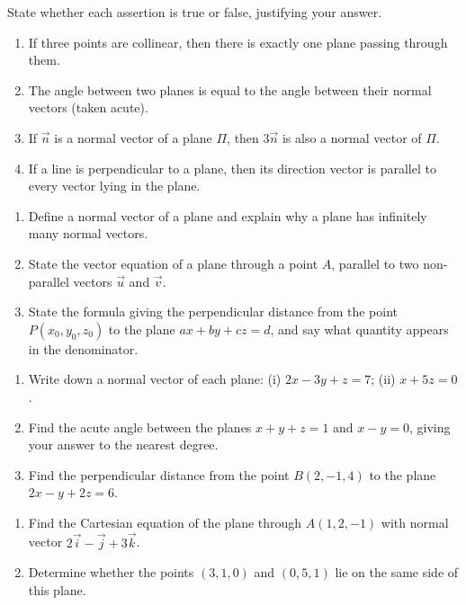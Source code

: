 \documentclass[11pt]{article}
\newcommand{\cle}[1]{{\popxbold\color{popdark}#1}}
\newcounter{popsec}
\newcounter{popsub}
\newcommand{\courssub}[1]{%
  \stepcounter{popsub}%
  \par\vspace{9pt}\noindent{\popxbold\fontsize{11.5}{13}\selectfont\color{popink}{\color{poporange}\thepopsec.\thepopsub}\hspace{6pt}#1}\par\nopagebreak\vspace{4pt}
}
\begin{document}
\begin{exercice}
State whether each assertion is true or false, justifying your answer.
\begin{enumerate}
\item If three points are collinear, then there is exactly one plane passing through them.
\item The angle between two planes is equal to the angle between their normal vectors (taken acute).
\item If $\vec{n}$ is a normal vector of a plane $\Pi$, then $3\vec{n}$ is also a normal vector of $\Pi$.
\item If a line is perpendicular to a plane, then its direction vector is parallel to every vector lying in the plane.
\end{enumerate}
\end{exercice}

\begin{exercice}
\begin{enumerate}
\item Define a \cle{normal vector} of a plane and explain why a plane has infinitely many normal vectors.
\item State the vector equation of a plane through a point $A$, parallel to two non-parallel vectors $\vec{u}$ and $\vec{v}$.
\item State the formula giving the perpendicular distance from the point $P(x_0,y_0,z_0)$ to the plane $ax+by+cz=d$, and say what quantity appears in the denominator.
\end{enumerate}
\end{exercice}

\begin{exercice}
\begin{enumerate}
\item Write down a normal vector of each plane: (i) $2x-3y+z=7$; (ii) $x+5z=0$.
\item Find the acute angle between the planes $x+y+z=1$ and $x-y=0$, giving your answer to the nearest degree.
\item Find the perpendicular distance from the point $B(2,-1,4)$ to the plane $2x-y+2z=6$.
\end{enumerate}
\end{exercice}

\courssub{I practise}

\begin{exercice}
\begin{enumerate}
\item Find the Cartesian equation of the plane through $A(1,2,-1)$ with normal vector $2\vec{i}-\vec{j}+3\vec{k}$.
\item Determine whether the points $(3,1,0)$ and $(0,5,1)$ lie on the same side of this plane.
\end{enumerate}
\end{exercice}
\end{document}
